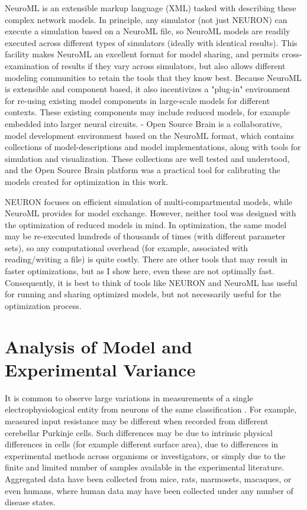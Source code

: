 NeuroML \cite{gleeson2010neuroml} is an extensible markup language (XML) tasked with describing these complex network models.
In principle, any simulator (not just NEURON) can execute a simulation based on a NeuroML file, so NeuroML models are readily executed across different types of simulators (ideally with identical results).
This facility makes NeuroML an excellent format for model sharing, and permits cross-examination of results if they vary across simulators, but also allows different modeling communities to retain the tools that they know best.
Because NeuroML is extensible and component based, it also incentivizes a "plug-in" environment for re-using existing model components in large-scale models for different contexts.
These existing components may include reduced models, for example embedded into larger neural circuits.
-
Open Source Brain \cite{gleeson2019open} is a collaborative, model development environment based on the NeuroML format, which contains collections of model-descriptions and model implementations, along with tools for simulation and visualization. These collections are well tested and understood, and the Open Source Brain platform was a practical tool for calibrating the models created for optimization in this work.

NEURON focuses on efficient simulation of multi-compartmental models, while NeuroML provides for model exchange. 
However, neither tool was designed with the optimization of reduced models in mind.
In optimization, the same model may be re-executed hundreds of thousands of times (with different parameter sets), so any computational overhead (for example, associated with reading/writing a file) is quite costly.  
There are other tools that may result in faster optimizations, but as I show here, even these are not optimally fast.
Consequently, it is best to think of tools like NEURON and NeuroML has useful for running and sharing optimized models, but not necessarily useful for the optimization process.  

\section{Analysis of Model and Experimental Variance}
It is common to observe large variations in measurements of a single electrophysiological entity from neurons of the same classification \cite{tripathy2014neuroelectro}.
For example, measured input resistance may be different when recorded from different cerebellar Purkinje cells.
Such differences may be due to intrinsic physical differences in cells (for example different surface area), due to differences in experimental methods across organisms or investigators, or simply due to the finite and limited number of samples available in the experimental literature.  
Aggregated data have been collected from mice, rats, marmosets, macaques, or even humans, where human data may have been collected under any number of disease states.

